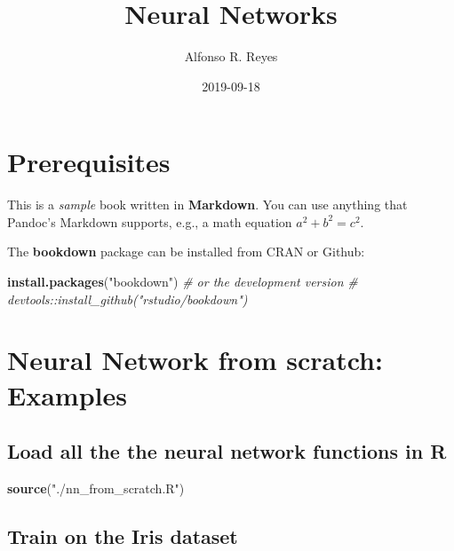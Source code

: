 \documentclass[]{book}
\title{Neural Networks}
\author{Alfonso R. Reyes}
\date{2019-09-18}
\newenvironment{Shaded}{\begin{snugshade}}{\end{snugshade}}
\newcommand{\CommentTok}[1]{\textcolor[rgb]{0.56,0.35,0.01}{\textit{#1}}}
\newcommand{\KeywordTok}[1]{\textcolor[rgb]{0.13,0.29,0.53}{\textbf{#1}}}
\newcommand{\NormalTok}[1]{#1}
\newcommand{\StringTok}[1]{\textcolor[rgb]{0.31,0.60,0.02}{#1}}
\begin{document}
\maketitle

{
\setcounter{tocdepth}{1}
\tableofcontents
}
\hypertarget{prerequisites}{%
\chapter*{Prerequisites}\label{prerequisites}}

This is a \emph{sample} book written in \textbf{Markdown}. You can use anything that Pandoc's Markdown supports, e.g., a math equation \(a^2 + b^2 = c^2\).

The \textbf{bookdown} package can be installed from CRAN or Github:

\begin{Shaded}
\begin{Highlighting}[]
\KeywordTok{install.packages}\NormalTok{(}\StringTok{"bookdown"}\NormalTok{)}
\CommentTok{# or the development version}
\CommentTok{# devtools::install_github("rstudio/bookdown")}
\end{Highlighting}
\end{Shaded}

\hypertarget{neural-network-from-scratch-examples}{%
\chapter{Neural Network from scratch: Examples}\label{neural-network-from-scratch-examples}}

\hypertarget{load-all-the-the-neural-network-functions-in-r}{%
\section{Load all the the neural network functions in R}\label{load-all-the-the-neural-network-functions-in-r}}

\begin{Shaded}
\begin{Highlighting}[]
\KeywordTok{source}\NormalTok{(}\StringTok{"./nn_from_scratch.R"}\NormalTok{)}
\end{Highlighting}
\end{Shaded}

\hypertarget{train-on-the-iris-dataset}{%
\section{Train on the Iris dataset}\label{train-on-the-iris-dataset}}
\end{document}
